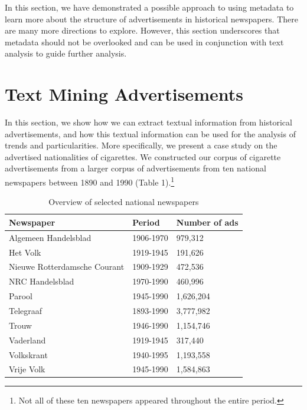 \documentclass[USenglish]{article}
\begin{document}
In this section, we have demonstrated a possible approach to using metadata to learn more about the structure of advertisements in historical newspapers. There are many more directions to explore. However, this section underscores that metadata should not be overlooked and can be used in conjunction with text analysis to guide further analysis. 

\section{Text Mining Advertisements}
In this section, we show how we can extract textual information from historical advertisements, and how this textual information can be used for the analysis of trends and particularities. More specifically, we present a case study on the advertised nationalities of cigarettes. We constructed our corpus of cigarette advertisements from a larger corpus of advertisements from ten national newspapers between 1890 and 1990 (Table 1).\footnote{Not all of these ten newspapers appeared throughout the entire period.}

\begin{table}
  \centering
  \begin{tabular}{lll}
    \toprule
    \textbf{Newspaper} &
    \textbf{Period} &
    \textbf{Number of ads} \\
    \midrule
    Algemeen Handelsblad         & 1906-1970 &   979,312 \\
    Het Volk                     & 1919-1945 &   191,626 \\
    Nieuwe Rotterdamsche Courant & 1909-1929 &   472,536 \\
    NRC Handelsblad              & 1970-1990 &   460,996 \\
    Parool                       & 1945-1990 & 1,626,204 \\
    Telegraaf                    & 1893-1990 & 3,777,982 \\
    Trouw                        & 1946-1990 & 1,154,746 \\
    Vaderland                    & 1919-1945 &   317,440 \\
    Volkskrant                   & 1940-1995 & 1,193,558 \\
    Vrije Volk                   & 1945-1990 & 1,584,863 \\
    \bottomrule 
  \end{tabular}
  \caption{Overview of selected national newspapers}
\end{table}
\end{document}
